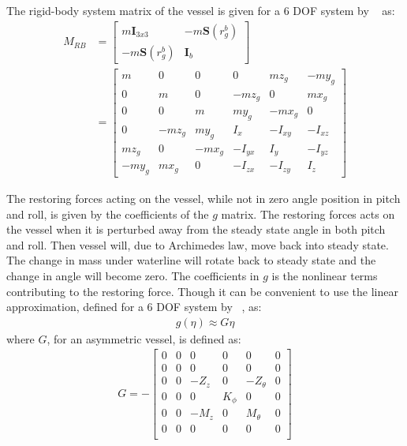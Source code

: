 The rigid-body system matrix of the vessel is given for a 6 \ac{DOF} system by ~\citep[eq. (3.44)]{fossen} as:
\begin{align}
M_{RB} &=
\begin{bmatrix}
m\boldsymbol{I}_{3x3} & -m\boldsymbol{S}(r^b_g)\\
-m\boldsymbol{S}(r^b_g) & \boldsymbol{I}_b
\end{bmatrix}
\nonumber\\
&=
\begin{bmatrix}
m & 0 & 0 & 0 & mz_g & -my_g\\
0 & m & 0 & -mz_g & 0 & mx_g\\
0 & 0 & m & my_g & -mx_g & 0\\
0 & -mz_g & my_g & I_x & -I_{xy} & -I_{xz}\\
mz_g & 0 & -mx_g & -I_{yx} & I_y & -I_{yz}\\
-my_g & mx_g & 0 & -I_{zx} & -I_{zy} & I_z
\end{bmatrix}
\end{align}

The restoring forces acting on the vessel, while not in zero angle position in pitch and roll, is given by the coefficients of the $g$ matrix. The restoring forces acts on the vessel when it is perturbed away from the steady state angle in both pitch and roll. Then vessel will, due to Archimedes law, move back into steady state. The change in mass under waterline will rotate back to steady state and the change in angle will become zero. The coefficients in $g$ is the nonlinear terms contributing to the restoring force. Though it can be convenient to use the linear approximation, defined for a 6 \ac{DOF} system by ~\citep[eq. (4.22)(4.26)]{fossen}, as:
\begin{align}
g(\eta) \approx G\eta
\end{align}
where $G$, for an asymmetric vessel, is defined as:
\begin{align}
G = -
\begin{bmatrix}
0 & 0 & 0 & 0 & 0 & 0\\
0 & 0 & 0 & 0 & 0 & 0\\
0 & 0 & -Z_z & 0 & -Z_\theta & 0\\
0 & 0 & 0 & K_\phi & 0 & 0\\
0 & 0 & -M_z & 0 & M_\theta & 0\\
0 & 0 & 0 & 0 & 0 & 0\\
\end{bmatrix}
\end{align}

